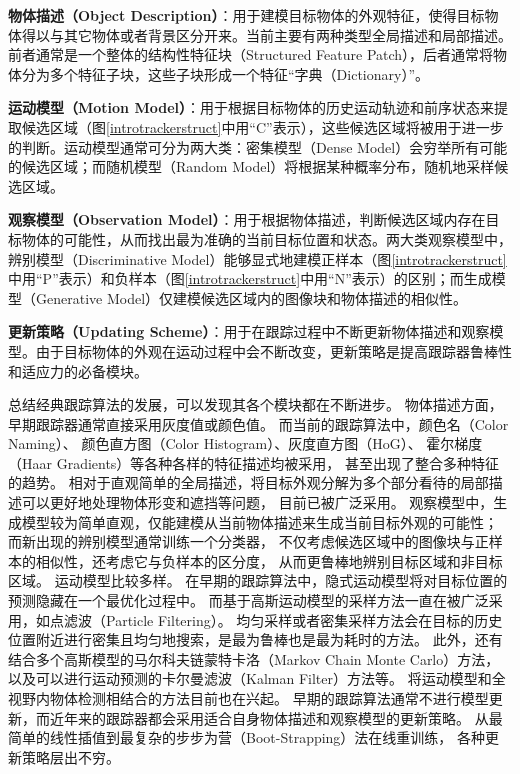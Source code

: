 \begin{compactitem}
\item	\textbf{物体描述（Object Description）}：用于建模目标物体的外观特征，使得目标物体得以与其它物体或者背景区分开来。当前主要有两种类型\pozhehao 全局描述和局部描述。前者通常是一个整体的结构性特征块（Structured Feature Patch），后者通常将物体分为多个特征子块，这些子块形成一个特征“字典（Dictionary）”。
\item	\textbf{运动模型（Motion Model）}：用于根据目标物体的历史运动轨迹和前序状态来提取候选区域（图\ref{introtrackerstruct}中用``C''表示），这些候选区域将被用于进一步的判断。运动模型通常可分为两大类：密集模型（Dense Model）会穷举所有可能的候选区域；而随机模型（Random Model）将根据某种概率分布，随机地采样候选区域。
\item	\textbf{观察模型（Observation Model）}：用于根据物体描述，判断候选区域内存在目标物体的可能性，从而找出最为准确的当前目标位置和状态。两大类观察模型中，辨别模型（Discriminative Model）能够显式地建模正样本（图\ref{introtrackerstruct}中用``P''表示）和负样本（图\ref{introtrackerstruct}中用``N''表示）的区别；而生成模型（Generative Model）仅建模候选区域内的图像块和物体描述的相似性。
\item	\textbf{更新策略（Updating Scheme）}：用于在跟踪过程中不断更新物体描述和观察模型。由于目标物体的外观在运动过程中会不断改变，更新策略是提高跟踪器鲁棒性和适应力的必备模块。
\end{compactitem}

总结经典跟踪算法的发展，可以发现其各个模块都在不断进步。
物体描述方面，早期跟踪器通常直接采用灰度值或颜色值。
而当前的跟踪算法中，颜色名（Color Naming）、
颜色直方图（Color Histogram）、灰度直方图（HoG）、
霍尔梯度（Haar Gradients）等各种各样的特征描述均被采用，
甚至出现了整合多种特征的趋势。
相对于直观简单的全局描述，将目标外观分解为多个部分看待的局部描述可以更好地处理物体形变和遮挡等问题，
目前已被广泛采用。
观察模型中，生成模型较为简单直观，仅能建模从当前物体描述来生成当前目标外观的可能性；
而新出现的辨别模型通常训练一个分类器，
不仅考虑候选区域中的图像块与正样本的相似性，还考虑它与负样本的区分度，
从而更鲁棒地辨别目标区域和非目标区域。
运动模型比较多样。
在早期的跟踪算法中，隐式运动模型将对目标位置的预测隐藏在一个最优化过程中。
而基于高斯运动模型的采样方法一直在被广泛采用，如点滤波（Particle Filtering）。
均匀采样或者密集采样方法会在目标的历史位置附近进行密集且均匀地搜索，是最为鲁棒也是最为耗时的方法。
此外，还有结合多个高斯模型的马尔科夫链蒙特卡洛（Markov Chain Monte Carlo）方法，
以及可以进行运动预测的卡尔曼滤波（Kalman Filter）方法等。
将运动模型和全视野内物体检测相结合的方法目前也在兴起。
早期的跟踪算法通常不进行模型更新，而近年来的跟踪器都会采用适合自身物体描述和观察模型的更新策略。
从最简单的线性插值到最复杂的步步为营（Boot-Strapping）法在线重训练，
各种更新策略层出不穷。

